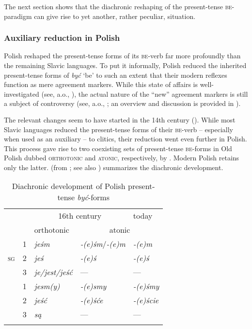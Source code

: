 \documentclass[output=paper]{langscibook}
\begin{document}
The next section shows that the diachronic reshaping of the present-tense \textsc{be}-paradigm can give rise to yet another, rather peculiar, situation.


\subsubsection{Auxiliary reduction in Polish}\label{pitsch:sec:Polish}

Polish reshaped the present-tense forms of its \textsc{be}-verb far more profoundly than the remaining Slavic languages. To put it informally, Polish reduced the inherited present-tense forms of \textit{być} `be' to such an extent that their modern reflexes function as mere agreement markers. While this state of affairs is well-investigated (see, a.o., \cites{Decaux1955}{Rittel1970}{Andersen1987}{PiskorzAbrahamLeiss2013}), the actual nature of the ``new'' agreement markers is still a subject of controversy (see, a.o., \cites{BooijRubach1987}{BorsleyRivero1994}{Embick1995}{FranksBanski1999}; an overview and discussion is provided in \cite[5--9]{Abramowicz2008}).

The relevant changes seem to have started in the 14th century (\cites[103]{Rittel1970}[41]{Migdalski2006}). While most Slavic languages reduced the present-tense forms of their \textsc{be}-verb -- especially when used as an auxiliary -- to clitics, their reduction went even further in Polish. This process gave rise to two coexisting sets of present-tense \textsc{be}-forms in Old Polish dubbed \textsc{orthotonic} and \textsc{atonic}, respectively, by \citet{Andersen1987}. Modern Polish retains only the latter.  (from \citealt[41]{Migdalski2006}; see also \cites[99--103]{Rittel1970}[24]{Andersen1987}[3]{Embick1995}) summarizes the diachronic development.


\begin{table}
\begin{tabularx}{7.7cm}{XXlll}
\lsptoprule
& & \multicolumn{2}{c}{16th century} & today \\
& & orthotonic & \multicolumn{2}{c}{atonic} \\ 
\midrule
\multirow{3}{*}{\textsc{sg}} & \textsc{1} & \textit{jeśm} & \textit{-(e)śm}/\textit{-(e)m} & \textit{-(e)m} \\ 
& \textsc{2} & \textit{jeś} & \textit{-(e)ś} & \textit{-(e)ś} \\ 
& \textsc{3} & \textit{je/jest/jeść} & --- & --- \\\addlinespace
\multirow{3}{*}{\textsc{pl}} & \textsc{1} & \textit{jesm(y)} & \textit{-(e)smy} & \textit{-(e)śmy} \\ 
& \textsc{2} & \textit{jeść} & \textit{-(e)śće} & \textit{-(e)ście} \\ 
& \textsc{3} & \textit{są} & --- & ---\\ 
\lspbottomrule
\end{tabularx}
\caption{Diachronic development of Polish present-tense \textit{być}-forms}
\label{pitsch:tab:OldPolish}
\end{table}
\end{document}

